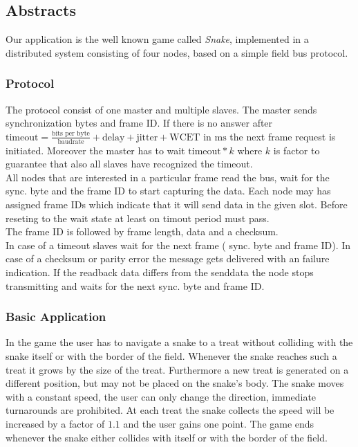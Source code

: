 \subsection{Abstracts}

Our application is the well known game called \textit{Snake}, implemented
in a distributed system consisting of four nodes, based on a simple field bus protocol.
\subsubsection{Protocol}
The protocol consist of one master and multiple slaves. The master sends synchronization bytes 
and frame ID. If there is no answer after $\text{timeout} =\frac{\text{bits per byte}}
{\text{baudrate}}+\text{delay}+\text{jitter}+\text{WCET} \text{ in ms}$ the next
frame request is initiated. Moreover the master has to wait $\text{timeout}*k$ where
$k$ is factor to guarantee that also all slaves have recognized the timeout.\\
All nodes that are interested in a particular frame
read the bus, wait for the sync. byte and the frame ID to start capturing the data.
Each node may has assigned frame IDs which indicate that it will send data in the 
given slot. Before reseting to the wait state at least on timout period must pass.\\
The frame ID is followed by frame length, data and a checksum. \\
In case of a timeout slaves wait for the next frame ( sync. byte and frame ID).
In case of a checksum or parity error the message gets delivered with an failure
indication. If the readback data differs from the senddata the node stops transmitting 
and waits for the next sync. byte and frame ID.

\subsubsection{Basic Application}
In the game the user has to navigate a snake to a treat without colliding
with the snake itself or with the border of the field. Whenever the snake
reaches such a treat it grows by the size of the treat. Furthermore a new
treat is generated on a different position, but may not be placed on the
snake's body. The snake moves with a constant speed, the user can only change
the direction, immediate turnarounds are prohibited. At each treat the snake 
collects the speed will be increased by a factor of $1.1$ and the user gains 
one point. The game ends whenever the snake either collides with itself or
with the border of the field. 

